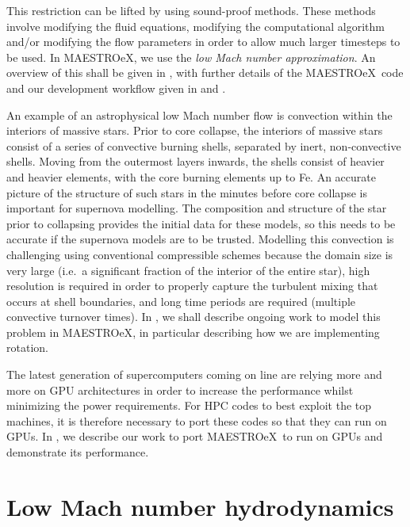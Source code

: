 \documentclass[a4paper]{jpconf}
\newcommand{\maestroex}{{\sffamily MAESTROeX}}
\begin{document}
This restriction can be lifted by using sound-proof methods. These methods involve modifying the fluid equations, modifying the computational algorithm and/or modifying the flow parameters in order to allow much larger timesteps to be used. In \maestroex, we use the \emph{low Mach number approximation}. An overview of this shall be given in , with further details of the \maestroex~code and our development workflow given in  and .  

An example of an astrophysical low Mach number flow is convection within the interiors of massive stars. Prior to core collapse, the interiors of massive stars consist of a series of convective burning shells, separated by inert, non-convective shells. Moving from the outermost layers inwards, the shells consist of heavier and heavier elements, with the core burning elements up to Fe. An accurate picture of the structure of such stars in the minutes before core collapse is important for supernova modelling. The composition and structure of the star prior to collapsing provides the initial data for these models, so this needs to be accurate if the supernova models are to be trusted. Modelling this convection is challenging using conventional compressible schemes because the domain size is very large (i.e.~a significant fraction of the interior of the entire star), high resolution is required in order to properly capture the turbulent mixing that occurs at shell boundaries, and long time periods are required (multiple convective turnover times). In , we shall describe ongoing work to model this problem in \maestroex, in particular describing how we are implementing rotation. 

The latest generation of supercomputers coming on line are relying more and more on GPU architectures in order to increase the performance whilst minimizing the power requirements. For HPC codes to best exploit the top machines, it is therefore necessary to port these codes so that they can run on GPUs. In , we describe our work to port \maestroex~to run on GPUs and demonstrate its performance.


\section{Low Mach number hydrodynamics} \label{sec:low_mach_hydro}
\end{document}
